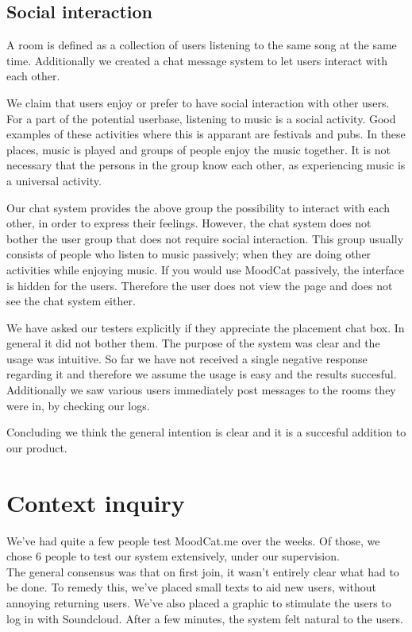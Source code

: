\subsection{Social interaction}

A room is defined as a collection of users listening to the same song at the same time.
Additionally we created a chat message system to let users interact with each other.

We claim that users enjoy or prefer to have social interaction with other users.
For a part of the potential userbase, listening to music is a social activity.
Good examples of these activities where this is apparant are festivals and pubs.
In these places, music is played and groups of people enjoy the music together.
It is not necessary that the persons in the group know each other, as experiencing music is a universal activity.

Our chat system provides the above group the possibility to interact with each other, in order to express their feelings.
However, the chat system does not bother the user group that does not require social interaction.
This group usually consists of people who listen to music passively; when they are doing other activities while enjoying music.
If you would use MoodCat passively, the interface is hidden for the users.
Therefore the user does not view the page and does not see the chat system either.

We have asked our testers explicitly if they appreciate the placement chat box.
In general it did not bother them.
The purpose of the system was clear and the usage was intuitive.
So far we have not received a single negative response regarding it and therefore we assume the usage is easy and the results succesful.
Additionally we saw various users immediately post messages to the rooms they were in, by checking our logs.

Concluding we think the general intention is clear and it is a succesful addition to our product.

\section{Context inquiry}
We've had quite a few people test MoodCat.me over the weeks. Of those, we chose 6 people to test our system extensively, under our supervision.\\

The general consensus was that on first join, it wasn't entirely clear what had to be done.
To remedy this, we've placed small texts to aid new users, without annoying returning users.
We've also placed a graphic to stimulate the users to log in with Soundcloud. After a few minutes, the system felt natural to the users.\\

